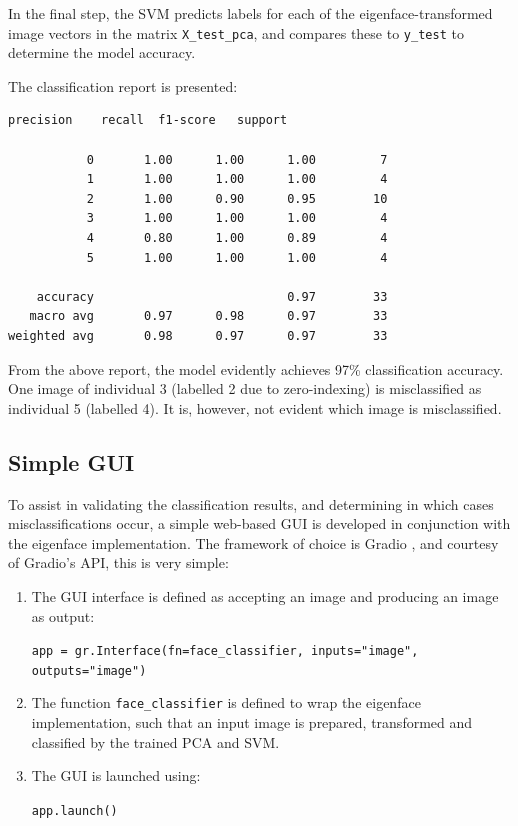 In the final step, the SVM predicts labels for each of the eigenface-transformed image vectors in the matrix \texttt{X\_test\_pca}, and compares these to \texttt{y\_test} to determine the model accuracy.

The classification report is presented:

\vspace{1em}
\begin{lstlisting}[numbers=none, xleftmargin=5em]
              precision    recall  f1-score   support

           0       1.00      1.00      1.00         7
           1       1.00      1.00      1.00         4
           2       1.00      0.90      0.95        10
           3       1.00      1.00      1.00         4
           4       0.80      1.00      0.89         4
           5       1.00      1.00      1.00         4

    accuracy                           0.97        33
   macro avg       0.97      0.98      0.97        33
weighted avg       0.98      0.97      0.97        33
\end{lstlisting}

From the above report, the model evidently achieves 97\% classification accuracy. One image of individual 3 (labelled 2 due to zero-indexing) is misclassified as individual 5 (labelled 4). It is, however, not evident which image is misclassified.

\subsection{Simple GUI}

To assist in validating the classification results, and determining in which cases misclassifications occur, a simple web-based GUI is developed in conjunction with the eigenface implementation. The framework of choice is Gradio \cite{gradio_2023}, and courtesy of Gradio's API, this is very simple:

\begin{enumerate}
  \item The GUI interface is defined as accepting an image and producing an image as output:
  \begin{center}
    \texttt{app = gr.Interface(fn=face\_classifier, inputs="image", outputs="image")}
  \end{center}

  \item The function \texttt{face\_classifier} is defined to wrap the eigenface implementation, such that an input image is prepared, transformed and classified by the trained PCA and SVM.

  \item The GUI is launched using:
  \begin{center}
    \texttt{app.launch()}
  \end{center}

\end{enumerate}
\vspace{1em}


